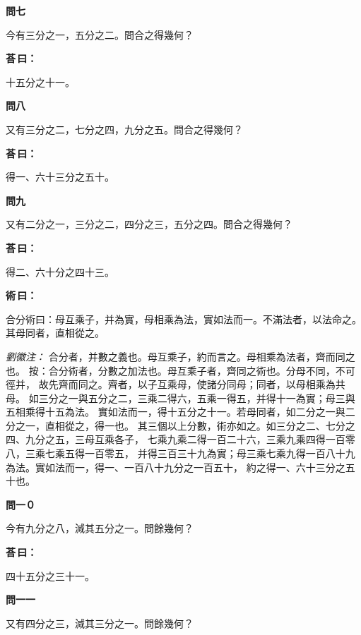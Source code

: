\documentclass[11pt,a4paper]{article}
\newenvironment{problem}[1][]{%
  \par\vspace{0.6em}\noindent\textcolor{problemcolor}{\textbf{問\ignorespaces#1\unskip}\hspace{0.5em}}%
  \ignorespaces
}{\par\vspace{0.4em}}
\newenvironment{answer}{%
  \par\noindent\textcolor{answercolor}{\textbf{荅\,曰：}}%
  \ignorespaces
}{\par\vspace{0.3em}}
\newenvironment{method}{%
  \par\noindent\textcolor{methodcolor}{\textbf{術\,曰：}}%
  \ignorespaces
}{\par\vspace{0.4em}}
\newenvironment{liuhuicomm}{%
  \par\vspace{0.3em}\noindent\textcolor{commentarycolor}{\small\textit{劉徽注：}}}%
  {\par\vspace{0.5em}}
\begin{document}
\begin{problem}[七]
今有三分之一，五分之二。問合之得幾何？
\end{problem}

\begin{answer}
十五分之十一。
\end{answer}

\begin{problem}[八]
又有三分之二，七分之四，九分之五。問合之得幾何？
\end{problem}

\begin{answer}
得一、六十三分之五十。
\end{answer}

\begin{problem}[九]
又有二分之一，三分之二，四分之三，五分之四。問合之得幾何？
\end{problem}

\begin{answer}
得二、六十分之四十三。
\end{answer}

\begin{method}
合分術曰：母互乘子，并為實，母相乘為法，實如法而一。不滿法者，以法命之。其母同者，直相從之。
\end{method}

\begin{liuhuicomm}
合分者，并數之義也。母互乘子，約而言之。母相乘為法者，齊而同之也。
按：合分術者，分數之加法也。母互乘子者，齊同之術也。分母不同，不可徑并，
故先齊而同之。齊者，以子互乘母，使諸分同母；同者，以母相乘為共母。
如三分之一與五分之二，三乘二得六，五乘一得五，并得十一為實；母三與五相乘得十五為法。
實如法而一，得十五分之十一。若母同者，如二分之一與二分之一，直相從之，得一也。
其三個以上分數，術亦如之。如三分之二、七分之四、九分之五，三母互乘各子，
七乘九乘二得一百二十六，三乘九乘四得一百零八，三乘七乘五得一百零五，
并得三百三十九為實；母三乘七乘九得一百八十九為法。實如法而一，得一、一百八十九分之一百五十，
約之得一、六十三分之五十也。
\end{liuhuicomm}

\begin{problem}[一０]
今有九分之八，減其五分之一。問餘幾何？
\end{problem}

\begin{answer}
四十五分之三十一。
\end{answer}

\begin{problem}[一一]
又有四分之三，減其三分之一。問餘幾何？
\end{problem}
\end{document}

